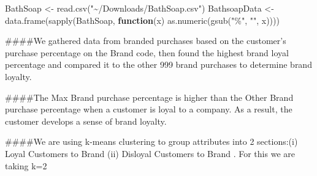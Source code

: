 \documentclass[
]{article}
\newenvironment{Shaded}{\begin{snugshade}}{\end{snugshade}}
\newcommand{\AttributeTok}[1]{\textcolor[rgb]{0.77,0.63,0.00}{#1}}
\newcommand{\ControlFlowTok}[1]{\textcolor[rgb]{0.13,0.29,0.53}{\textbf{#1}}}
\newcommand{\DecValTok}[1]{\textcolor[rgb]{0.00,0.00,0.81}{#1}}
\newcommand{\FunctionTok}[1]{\textcolor[rgb]{0.00,0.00,0.00}{#1}}
\newcommand{\NormalTok}[1]{#1}
\newcommand{\OtherTok}[1]{\textcolor[rgb]{0.56,0.35,0.01}{#1}}
\newcommand{\SpecialCharTok}[1]{\textcolor[rgb]{0.00,0.00,0.00}{#1}}
\newcommand{\StringTok}[1]{\textcolor[rgb]{0.31,0.60,0.02}{#1}}
\begin{document}
\begin{Shaded}
\begin{Highlighting}[]
\NormalTok{BathSoap }\OtherTok{\textless{}{-}} \FunctionTok{read.csv}\NormalTok{(}\StringTok{"\textasciitilde{}/Downloads/BathSoap.csv"}\NormalTok{)}
\NormalTok{BathsoapData }\OtherTok{\textless{}{-}} \FunctionTok{data.frame}\NormalTok{(}\FunctionTok{sapply}\NormalTok{(BathSoap, }\ControlFlowTok{function}\NormalTok{(x) }\FunctionTok{as.numeric}\NormalTok{(}\FunctionTok{gsub}\NormalTok{(}\StringTok{"\%"}\NormalTok{, }\StringTok{""}\NormalTok{, x))))}
\end{Highlighting}
\end{Shaded}

\#\#\#\#We gathered data from branded purchases based on the customer's
purchase percentage on the Brand code, then found the highest brand
loyal percentage and compared it to the other 999 brand purchases to
determine brand loyalty.

\#\#\#\#The Max Brand purchase percentage is higher than the Other Brand
purchase percentage when a customer is loyal to a company. As a result,
the customer develops a sense of brand loyalty.

\#\#\#\#We are using k-means clustering to group attributes into 2
sections:(i) Loyal Customers to Brand (ii) Disloyal Customers to Brand .
For this we are taking k=2

\begin{Shaded}
\end{Shaded}
\end{document}
